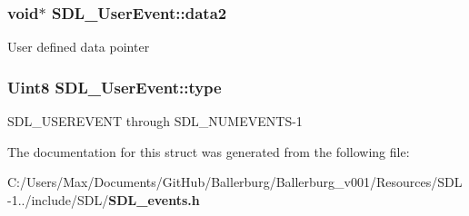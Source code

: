 \subsubsection[{data2}]{\setlength{\rightskip}{0pt plus 5cm}void$\ast$ S\+D\+L\+\_\+\+User\+Event\+::data2}\label{struct_s_d_l___user_event_aae4dbf65c34d654c9edf519eb061b7cf}
User defined data pointer 
\subsubsection[{type}]{\setlength{\rightskip}{0pt plus 5cm}Uint8 S\+D\+L\+\_\+\+User\+Event\+::type}\label{struct_s_d_l___user_event_a4ad7c1f518eef5dfedc09c9bab1d1e42}
S\+D\+L\+\_\+\+U\+S\+E\+R\+E\+V\+E\+N\+T through S\+D\+L\+\_\+\+N\+U\+M\+E\+V\+E\+N\+T\+S-\/1 

The documentation for this struct was generated from the following file\+:\begin{DoxyCompactItemize}
\item 
C\+:/\+Users/\+Max/\+Documents/\+Git\+Hub/\+Ballerburg/\+Ballerburg\+\_\+v001/\+Resources/\+S\+D\+L-\/1../include/\+S\+D\+L/{\bf S\+D\+L\+\_\+events.\+h}\end{DoxyCompactItemize}
